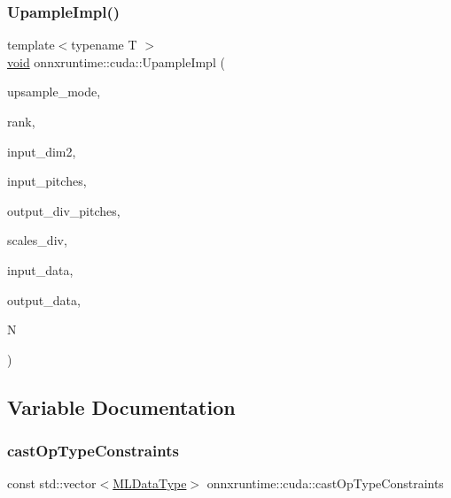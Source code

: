 \subsubsection{\texorpdfstring{Upample\+Impl()}{UpampleImpl()}}
{\footnotesize\ttfamily template$<$typename T $>$ \\
\mbox{\hyperlink{mlasi_8h_a88f941d423cb2a819b70a1358982b1a6}{void}} onnxruntime\+::cuda\+::\+Upample\+Impl (\begin{DoxyParamCaption}\item[{const \mbox{\hyperlink{namespaceonnxruntime_ac1731b73e10b6a91015c32c7e29d03bd}{onnxruntime\+::\+Upsample\+Mode}}}]{upsample\+\_\+mode,  }\item[{const \mbox{\hyperlink{mlasi_8h_a503efbc1c6e50825320ad909366b78ab}{size\+\_\+t}}}]{rank,  }\item[{const int64\+\_\+t}]{input\+\_\+dim2,  }\item[{const int64\+\_\+t $\ast$}]{input\+\_\+pitches,  }\item[{const \mbox{\hyperlink{classonnxruntime_1_1cuda_1_1fast__divmod}{fast\+\_\+divmod}} $\ast$}]{output\+\_\+div\+\_\+pitches,  }\item[{const \mbox{\hyperlink{classonnxruntime_1_1cuda_1_1fast__divmod}{fast\+\_\+divmod}} $\ast$}]{scales\+\_\+div,  }\item[{const T $\ast$}]{input\+\_\+data,  }\item[{T $\ast$}]{output\+\_\+data,  }\item[{const \mbox{\hyperlink{mlasi_8h_a503efbc1c6e50825320ad909366b78ab}{size\+\_\+t}}}]{N }\end{DoxyParamCaption})}



\subsection{Variable Documentation}
\mbox{\label{namespaceonnxruntime_1_1cuda_a272ed1bb036b029ae628321d1ff6bd0a}} 
\subsubsection{\texorpdfstring{cast\+Op\+Type\+Constraints}{castOpTypeConstraints}}
{\footnotesize\ttfamily const std\+::vector$<$\mbox{\hyperlink{namespaceonnxruntime_ad77d0a6e838ec7da5dc35fed5ee66b49}{M\+L\+Data\+Type}}$>$ onnxruntime\+::cuda\+::cast\+Op\+Type\+Constraints}

